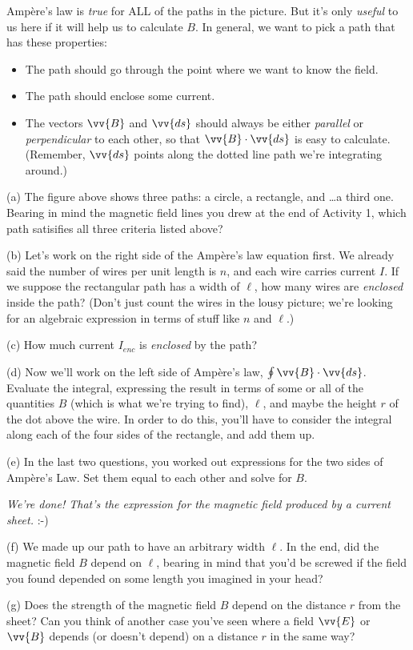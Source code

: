 Amp\`ere's law is \textit{true} for ALL of the paths in the picture.  But it's only \textit{useful} to us here if it will help us to calculate $B$.  In general, we want to pick a path that has these properties:
\begin{itemize}[nosep]
\item The path should go through the point where we want to know the field.
\item The path should enclose some current.
\item The vectors $\vv{B}$ and $\vv{ds}$ should always be either \textit{parallel} or \textit{perpendicular} to each other, so that $\vv{B}\cdot \vv{ds}$ is easy to calculate.  (Remember, $\vv{ds}$ points along the dotted line path we're integrating around.)
\end{itemize}

(a) The figure above shows three paths: a circle, a rectangle, and \ldots a third one.  Bearing in mind the magnetic field lines you drew at the end of Activity 1, which path satisifies all three criteria listed above?
\answerspace{0.3in}

\pagebreak[3]
(b) Let's work on the right side of the Amp\`ere's law equation first.  We already said the number of wires per unit length is $n$, and each wire carries current $I$.  If we suppose the rectangular path has a width of $\ell$, how many wires are \textit{enclosed} inside the path?  (Don't just count the wires in the lousy picture; we're looking for 
an algebraic expression in terms of stuff like $n$ and $\ell$.)
\answerspace{0.3in}

(c) How much current $I_{enc}$ is \textit{enclosed} by the path?
\answerspace{0.5in}

(d) Now we'll work on the left side of Amp\`ere's law, $\oint \vv {B}\cdot \vv{ds}$.  Evaluate the integral, 
expressing the result in terms of some
or all of the quantities $B$ (which is what we're trying
to find), $\ell$, and maybe the height $r$ of the dot above the wire.  In order to do this, you'll have to consider
the integral along each of the four sides of the rectangle,
and add them up.
\answerspace{1.3in}

(e) In the last two questions, you worked out expressions
for the two sides of Amp\`ere's Law. Set them equal to each other
and solve for $B$.
\answerspace{1in}

\centerline{\textit{We're done! That's the expression for the magnetic field produced 
by a current sheet.}  :-)}

(f) We made up our path to have an arbitrary width $\ell$.  In the end, did the magnetic field $B$ depend on $\ell$, bearing in mind that you'd be screwed if the field you found depended on some length you imagined in your head?
\answerspace{0.4in}

(g) Does the strength of the magnetic field $B$ depend on the
distance $r$ from the sheet?  Can you think of another case you've seen where a field $\vv{E}$ or $\vv{B}$ depends (or doesn't depend) on a distance $r$ in the same way?
\answerspace{0.4in}
